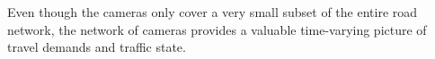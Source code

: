 Even though the cameras only cover a very small subset of the entire road network, the network of cameras provides a valuable time-varying picture of travel demands and traffic state.


